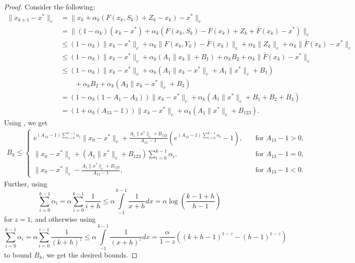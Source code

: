 \documentclass{article}
\newcommand{\lrp}[1]{\left( #1 \right)}
\begin{document}
\begin{proof} 
Consider the following: 
\begin{align*}
    \|{x}_{k+1} - x^*\|_c 
    &= \|{x}_k + \alpha_k(F({x}_k, S_k) + Z_k - {x}_k) - x^*\|_c \\ 
    &= \|(1-\alpha_k)({x}_k - x^*) + \alpha_k(F({x}_k, S_k) - \bar{F}({x}_k) + Z_k + \bar{F}({x}_k) - x^*)\|_c \\
    &\le (1-\alpha_k) \|{x}_k - x^*\|_c + \alpha_k \|F({x}_k, Y_k) - \bar{F}({x}_k)\|_c + \alpha_k \|Z_k\|_c + \alpha_k \| \bar{F}({x}_k) - x^*\|_c\\
    &\le (1-\alpha_k) \|{x}_k - x^*\|_c + \alpha_k \lrp{A_1 \|{x}_k\| + B_1} + \alpha_k B_2 + \alpha_k \|\bar{F}({x}_k) - x^*\|_c\\
    &\le (1-\alpha_k) \|{x}_k - x^*\|_c + \alpha_k\lrp{A_1 \|{x}_k - x^*\|_c + A_1\|x^*\|_c + B_1} \\
    &\qquad + \alpha_k  B_2 + \alpha_k \lrp{A_3 \|{x}_k - x^*\|_c + B_3 } \\
    &= \lrp{1-\alpha_k\lrp{1- A_1 - A_3}}\|{x}_k - x^*\|_c + \alpha_k \lrp{A_1 \|x^*\|_c + B_1 + B_2 + B_3}\\
    &= \lrp{1+\alpha_k\lrp{A_{13} - 1}} \|{x}_k - x^*\|_c + \alpha_k \lrp{A_1 \|x^*\|_c + B_{123}}.
\end{align*}
Using \cite[Lemma 3.1]{chen2025concentration}, we get 
\begin{align*}
    B_k \le \begin{cases}
        e^{(A_{13}-1) \sum\limits_{i=0}^{k-1}\alpha_i}\|{x}_0 - x^*\|_c  + \frac{A_1 \|x^*\|_c + B_{123}}{A_{13}-1} \lrp{e^{(A_{13}-1) \sum\limits_{i=0}^{k-1}\alpha_i}  - 1}, \quad &\text{for } A_{13} - 1  > 0,\\
        \|{x}_0 - x^*\|_c + (A_1 \|x^*\|_c + B_{123}) \sum\limits_{i=0}^{k-1}\alpha_i,\quad &\text{for } A_{13} - 1 = 0,\\
        \|{x}_0 - x^*\|_c - \frac{A_1 \|x^*\|_c + B_{123}}{A_{13}-1}, \quad &\text{for } A_{13}-1 < 0.
    \end{cases}
\end{align*}
Further, using 
    \[ \sum\limits_{i=0}^{k-1}\alpha_i  = \alpha \sum\limits_{i=0}^{k-1} \frac{1}{i+h} \le \alpha \int\limits_{-1}^{k-1} \frac{1}{x+h} dx = \alpha \log\lrp{\frac{k-1+h}{h-1}} \]
for $z=1$, and otherwise using
\[ \sum\limits_{i=0}^{k-1}\alpha_i  = \alpha \sum\limits_{i=0}^{i-1} \frac{1}{(k+h)^z} \le \alpha \int\limits_{-1}^{k-1} \frac{1}{(x+h)^z} dx = \frac{\alpha}{1-z}\lrp{ (k+h-1)^{1-z} - (h-1)^{1-z} } \]
to bound $B_k$, we get the desired bounds.
\end{proof}
\end{document}

